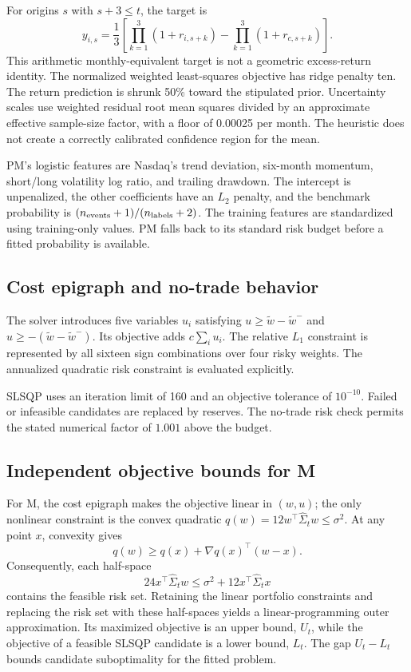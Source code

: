\documentclass[12pt,letterpaper]{article}
\begin{document}
For origins $s$ with $s+3\le t$, the target is
\begin{equation}
y_{i,s}=\frac{1}{3}\left[\prod_{k=1}^{3}(1+r_{i,s+k})-\prod_{k=1}^{3}(1+r_{c,s+k})\right].
\end{equation}
This arithmetic monthly-equivalent target is not a geometric excess-return identity. The normalized weighted least-squares objective has ridge penalty ten. The return prediction is shrunk 50\% toward the stipulated prior. Uncertainty scales use weighted residual root mean squares divided by an approximate effective sample-size factor, with a floor of 0.00025 per month. The heuristic does not create a correctly calibrated confidence region for the mean.

PM's logistic features are Nasdaq's trend deviation, six-month momentum, short/long volatility log ratio, and trailing drawdown. The intercept is unpenalized, the other coefficients have an $L_2$ penalty, and the benchmark probability is $(n_{\rm events}+1)/(n_{\rm labels}+2)$. The training features are standardized using training-only values. PM falls back to its standard risk budget before a fitted probability is available.

\subsection{Cost epigraph and no-trade behavior}
The solver introduces five variables $u_i$ satisfying $u\ge\widetilde w-\widetilde w^{-}$ and $u\ge-(\widetilde w-\widetilde w^{-})$. Its objective adds $c\sum_i u_i$. The relative $L_1$ constraint is represented by all sixteen sign combinations over four risky weights. The annualized quadratic risk constraint is evaluated explicitly.

SLSQP uses an iteration limit of 160 and an objective tolerance of $10^{-10}$. Failed or infeasible candidates are replaced by reserves. The no-trade risk check permits the stated numerical factor of $1.001$ above the budget.

\subsection{Independent objective bounds for M}\label{app:solver-bounds}
For M, the cost epigraph makes the objective linear in $(w,u)$; the only nonlinear constraint is the convex quadratic $q(w)=12w^\top\widehat\Sigma_tw\le\sigma^2$. At any point $x$, convexity gives
\begin{equation}
q(w)\ge q(x)+\nabla q(x)^\top(w-x).
\end{equation}
Consequently, each half-space
\begin{equation}
24x^\top\widehat\Sigma_tw\le\sigma^2+12x^\top\widehat\Sigma_tx
\end{equation}
contains the feasible risk set. Retaining the linear portfolio constraints and replacing the risk set with these half-spaces yields a linear-programming outer approximation. Its maximized objective is an upper bound, $U_t$, while the objective of a feasible SLSQP candidate is a lower bound, $L_t$. The gap $U_t-L_t$ bounds candidate suboptimality for the fitted problem.
\end{document}
